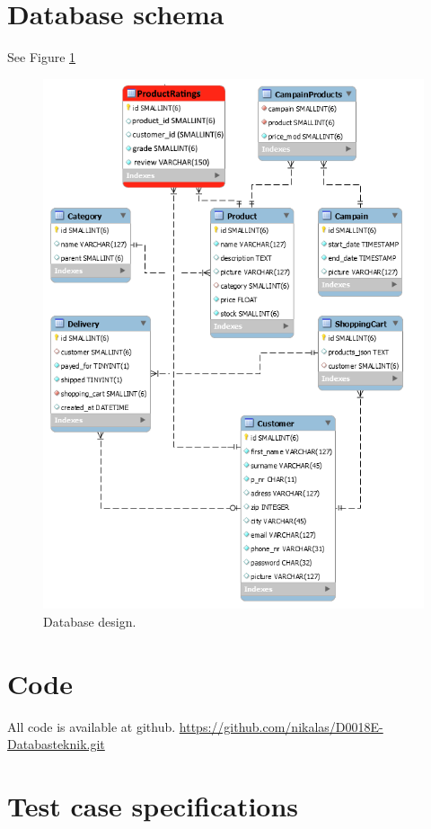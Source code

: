\documentclass[paper=a4, fontsize=11pt]{report} %
\begin{document}
\begin{itemize}
\section*{Database schema}
See Figure \ref{fig:db}

\begin{figure}
	\includegraphics[width=\textwidth]{artifacts/db_implemented_1_3.png}
	\caption{Database design.}
	\label{fig:db}
\end{figure}

\section*{Code}
All code is available at github.
\url{https://github.com/nikalas/D0018E-Databasteknik.git}

\section*{Test case specifications}


\end{itemize}
\end{document}
